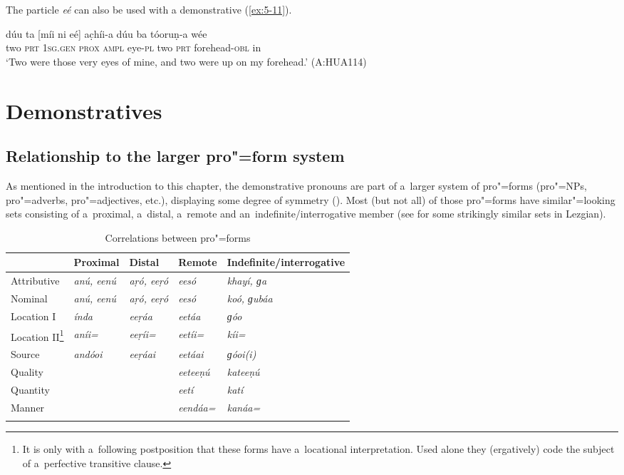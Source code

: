 The particle \textit{eé} can also be used with  a demonstrative (\ref{ex:5-11}). 


\begin{exe}
\ex
\label{ex:5-11}
\gll dúu ta [míi ni eé] ac̣híi-a dúu ba tóoruṇ-a wée \\
	two \textsc{prt} \textsc{1sg.gen} \textsc{prox} \textsc{ampl} eye-\textsc{pl} two \textsc{prt} forehead-\textsc{obl} in \\
\glt `Two were those very eyes of mine, and two were up on my forehead.' (A:HUA114) 
\end{exe}

\section{Demonstratives}
\label{sec:5-3}

\subsection{Relationship to the larger pro"=form system}
\label{subsec:5-2-1}


As mentioned in the introduction to this chapter, the demonstrative pronouns are part of a~larger system of pro"=forms (pro"=NPs, pro"=adverbs, pro"=adjectives, etc.), displaying some degree of symmetry (). Most (but not all) of those pro"=forms have similar"=looking sets consisting of a~proximal, a~distal, a~remote and an~indefinite/interrogative member (see \citealt[187--188]{haspelmath1993} for some strikingly similar sets in Lezgian).



\begin{table}[ht]
\caption{Correlations between pro"=forms}
\begin{tabularx}{\textwidth}{ Q Q Q Q Q }
\lsptoprule
&
Proximal
&
Distal
&
Remote
&
Indefinite/{\allowbreak}interrogative\\\hline
Attributive &
\textit{anú, eenú} &
\textit{aṛó, eeṛó} &
\textit{eesó} &
\textit{khayí, ɡa} \\
Nominal &
\textit{anú, eenú} &
\textit{aṛó, eeṛó} &
\textit{eesó} &
\textit{koó, ɡubáa} \\
Location I &
\textit{índa} &
\textit{eeṛáa} &
\textit{eetáa} &
\textit{ɡóo} \\
Location II\footnote{It is only with a~following postposition that these forms have a~locational interpretation. Used alone they (ergatively) code the subject of a~perfective transitive clause.} &
\textit{aníi=} &
\textit{eeṛíi=} &
\textit{eetíi=} &
\textit{kíi=} \\
Source &
\textit{andóoi} &
\textit{eeṛáai} &
\textit{eetáai} &
\textit{ɡóoi(i)} \\
Quality &
&
&
\textit{eeteeṇú} &
\textit{kateeṇú} \\
Quantity &
&
&
\textit{eetí} &
\textit{katí} \\
Manner &
&
&
\textit{eendáa=} &
\textit{kanáa=} \\\lspbottomrule
\end{tabularx}
\label{tab:5-2}
\end{table}

